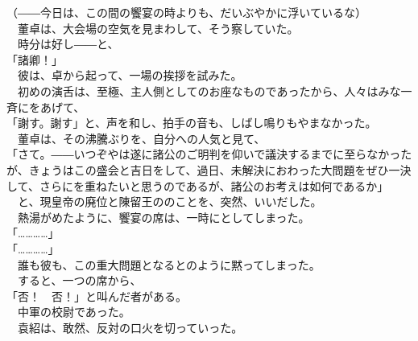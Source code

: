 \documentclass[
  paper=a5,
  fontsize=10pt,
  jafontsize=9.5pt,
  tate,                  %
  open_bracket_pos=nibu, %
]{jlreq}
\begin{document}
（――今日は、この間の饗宴の時よりも、だいぶやかに浮いているな）\\


　董卓は、大会場の空気を見まわして、そう察していた。\\


　時分は好し――と、\\


「諸卿！」\\


　彼は、卓から起って、一場の挨拶を試みた。\\


　初めの演舌は、至極、主人側としてのお座なものであったから、人々はみな一斉にをあげて、\\


「謝す。謝す」と、声を和し、拍手の音も、しばし鳴りもやまなかった。\\


　董卓は、その沸騰ぶりを、自分への人気と見て、\\


「さて。――いつぞやは遂に諸公のご明判を仰いで議決するまでに至らなかったが、きょうはこの盛会と吉日をして、過日、未解決におわった大問題をぜひ一決して、さらにを重ねたいと思うのであるが、諸公のお考えは如何であるか」\\


　と、現皇帝の廃位と陳留王ののことを、突然、いいだした。\\


　熱湯がめたように、饗宴の席は、一時にとしてしまった。\\


「…………」\\


「…………」\\


　誰も彼も、この重大問題となるとのように黙ってしまった。\\


　すると、一つの席から、\\


「否！　否！」と叫んだ者がある。\\


　中軍の校尉であった。\\


　袁紹は、敢然、反対の口火を切っていった。\\
\end{document}
